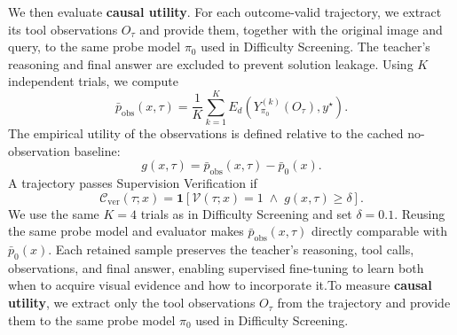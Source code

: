 

We then evaluate \textbf{causal utility}. 
For each outcome-valid trajectory, we extract its tool observations $O_\tau$ and provide them, together with the original image and query, to the same probe model $\pi_0$ used in Difficulty Screening. 
The teacher's reasoning and final answer are excluded to prevent solution leakage. 
Using $K$ independent trials, we compute
\begin{equation}
\bar{p}_{\mathrm{obs}}(x,\tau)=\frac{1}{K}\sum_{k=1}^{K}E_d\left(Y_{\pi_0}^{(k)}(O_\tau),y^\star
\right).
\label{eq:observation-success-rate}
\end{equation}
The empirical utility of the observations is defined relative
to the cached no-observation baseline:
\begin{equation}
g(x,\tau)=\bar{p}_{\mathrm{obs}}(x,\tau)-\bar{p}_0(x).
\label{eq:observation-gain}
\end{equation}
A trajectory passes Supervision Verification if
\begin{equation}
\mathcal{C}_{\mathrm{ver}}(\tau;x)=\mathbf{1}\left[\mathcal{V}(\tau;x)=1\;\land\;g(x,\tau)\geq\delta
\right].
\label{eq:supervision-verification}
\end{equation}
We use the same $K=4$ trials as in Difficulty Screening and set $\delta=0.1$. 
Reusing the same probe model and evaluator makes $\bar{p}_{\mathrm{obs}}(x,\tau)$ directly comparable with $\bar{p}_0(x)$.
Each retained sample preserves the teacher's reasoning, tool calls, observations, and final answer, enabling supervised fine-tuning to learn both when to acquire visual evidence and how to incorporate it.To measure \textbf{causal utility}, we extract only the tool observations $O_\tau$ from the trajectory and provide them to the same probe model $\pi_0$ used in Difficulty Screening.

